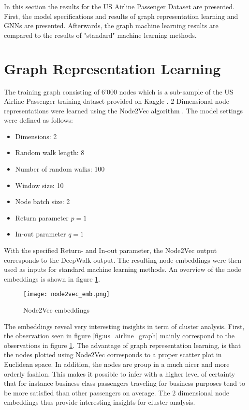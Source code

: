   
  In this section the results for the US Airline Passenger Dataset are
  presented. First, the model specifications and results of graph
  representation learning and GNNs are presented. Afterwards, the graph machine
  learning results are compared to the results of "standard" machine
  learning methods.

  \section{Graph Representation Learning}

  The training graph consisting of 6'000 nodes which is a sub-sample of the
  US Airline Passenger training dataset provided on Kaggle \citep{KAGGLE2015}.
  2 Dimensional node representations were learned using the Node2Vec algorithm
  \citep{grover2016node2vec}. The model settings were defined as follows:

  \begin{itemize}[itemsep=1mm]
    \item Dimensions: 2
    \item Random walk length: 8
    \item Number of random walks: 100
    \item Window size: 10
    \item Node batch size: 2
    \item Return parameter $p=1$
    \item In-out parameter $q=1$
  \end{itemize}

  \noindent With the specified Return- and In-out parameter, the Node2Vec
  output corresponds to the DeepWalk output. The resulting node embeddings were
  then used as inputs for standard machine learning methods. An overview of the
  node embeddings is shown in figure \ref{fig:node2vec}. 

  \begin{figure}[h]
		\centering
		\texttt{[image: node2vec\_emb.png]}
		\caption{Node2Vec embeddings}
        \label{fig:node2vec}
  \end{figure}

  \noindent The embeddings reveal very interesting insights in term of cluster
  analysis. First, the observation seen in figure \ref{fig:us_airline_graph}
  mainly correspond to the observations in figure \ref{fig:node2vec}. The
  advantage of graph representation learning, is that the nodes plotted using
  Node2Vec corresponds to a proper scatter plot in Euclidean space. In
  addition, the nodes are group in a much nicer and more orderly fashion. This
  makes it possible to infer with a higher level of certainty that for instance
  business class passengers traveling for business purposes tend to be more
  satisfied than other passengers on average. The 2 dimensional node embeddings
  thus provide interesting insights for cluster analysis. \\

